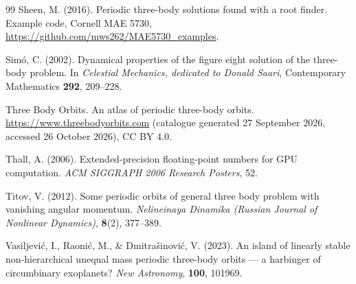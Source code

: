 \documentclass[11pt,a4paper]{article}
\begin{document}
\begin{thebibliography}{99}
Sheen, M. (2016).
Periodic three-body solutions found with a root finder.
Example code, Cornell MAE 5730, \url{https://github.com/mws262/MAE5730_examples}.

Sim{\'o}, C. (2002).
Dynamical properties of the figure eight solution of the three-body problem.
In \textit{Celestial Mechanics, dedicated to Donald Saari}, Contemporary Mathematics \textbf{292},
209--228.

Three Body Orbits.
An atlas of periodic three-body orbits.
\url{https://www.threebodyorbits.com} (catalogue generated 27 September 2026, accessed 26 October
2026), CC BY 4.0.

Thall, A. (2006).
Extended-precision floating-point numbers for GPU computation.
\textit{ACM SIGGRAPH 2006 Research Posters}, 52.

Titov, V. (2012).
Some periodic orbits of general three body problem with vanishing angular momentum.
\textit{Nelineinaya Dinamika (Russian Journal of Nonlinear Dynamics)}, \textbf{8}(2), 377--389.

Vasiljevi{\'c}, I., Raoni{\'c}, M., \& Dmitra{\v{s}}inovi{\'c}, V. (2023).
An island of linearly stable non-hierarchical unequal mass periodic three-body orbits --- a
harbinger of circumbinary exoplanets?
\textit{New Astronomy}, \textbf{100}, 101969.

\end{thebibliography}
\end{document}
